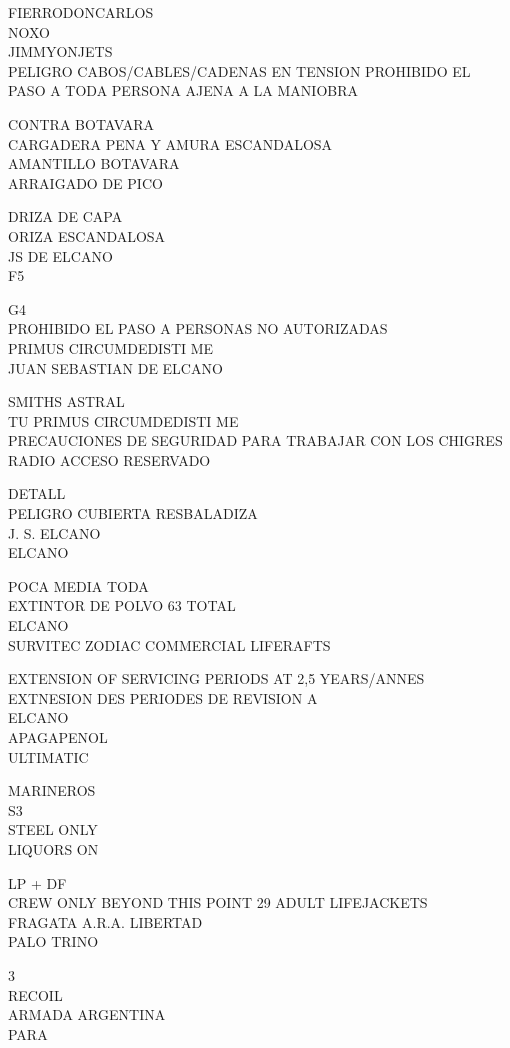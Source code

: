 \documentclass[10pt,letterpaper]{article}
\begin{document}
FIERRODONCARLOS\\
NOXO\\
JIMMYONJETS\\
PELIGRO CABOS/CABLES/CADENAS EN TENSION PROHIBIDO EL PASO A TODA PERSONA AJENA A LA MANIOBRA

CONTRA BOTAVARA\\
CARGADERA PENA Y AMURA ESCANDALOSA\\
AMANTILLO BOTAVARA\\
ARRAIGADO DE PICO

DRIZA DE CAPA\\
ORIZA ESCANDALOSA\\
JS DE ELCANO\\
F5

G4\\
PROHIBIDO EL PASO A PERSONAS NO AUTORIZADAS\\
PRIMUS CIRCUMDEDISTI ME\\
JUAN SEBASTIAN DE ELCANO

SMITHS ASTRAL\\
TU PRIMUS CIRCUMDEDISTI ME\\
PRECAUCIONES DE SEGURIDAD PARA TRABAJAR CON LOS CHIGRES\\
RADIO ACCESO RESERVADO

DETALL\\
PELIGRO CUBIERTA RESBALADIZA\\
J. S. ELCANO\\
ELCANO

POCA MEDIA TODA\\
EXTINTOR DE POLVO 63 TOTAL\\
ELCANO\\
SURVITEC ZODIAC COMMERCIAL LIFERAFTS

EXTENSION OF SERVICING PERIODS AT 2,5 YEARS/ANNES EXTNESION DES PERIODES DE REVISION A\\
ELCANO\\
APAGAPENOL\\
ULTIMATIC

MARINEROS\\
S3\\
STEEL ONLY\\
LIQUORS ON

LP + DF\\
CREW ONLY BEYOND THIS POINT 29 ADULT LIFEJACKETS\\
FRAGATA A.R.A. LIBERTAD\\
PALO TRINO

3\\
RECOIL\\
ARMADA ARGENTINA\\
PARA
\end{document}
